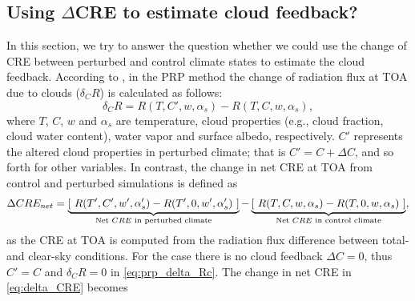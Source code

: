 \subsection{Using $\Delta$CRE to estimate cloud feedback?}
\label{sec:CRE_or_PRP}

In this section, we try to answer the question whether we could use the change of CRE between perturbed and control climate states to estimate the cloud feedback.
According to \cite{Soden2004}, in the PRP method the change of radiation flux at TOA due to clouds ($\delta_C {R}$) is calculated as follows:
\begin{equation}
    \delta_C R = {R}(T, C', w, \alpha_s) - {R}(T, C, w, \alpha_s),
    \label{eq:prp_delta_Rc}
\end{equation}
where $T$, $C$, $w$ and $\alpha_s$ are temperature, cloud properties (e.g., cloud fraction, cloud water content), water vapor and surface albedo, respectively. $C'$ represents the altered cloud properties in perturbed climate; that is $C'=C+\Delta C$, and so forth for other variables. 
In contrast, the change in net CRE at TOA from control and perturbed simulations is defined as
\begin{equation}
    \Delta CRE_{net} = \underbrace{\left[~{R}(T', C', w', \alpha'_s) - {R}(T', 0, w', \alpha'_s) ~\right]}_\text{\textcolor{black}{Net $CRE$ in perturbed climate}} - 
    \underbrace{\left[~{R}(T, C, w, \alpha_s)  - {R}(T, 0, w, \alpha_s) ~\right]}_\text{\textcolor{black}{Net $CRE$ in control climate}},
    \label{eq:delta_CRE}
\end{equation}
as the CRE at TOA is computed from the radiation flux difference between total- and clear-sky conditions. For the case there is no cloud feedback $\Delta C=0$, thus $C'=C$ and $\delta_C {R}=0$ in \eqref{eq:prp_delta_Rc}. The change in net CRE in \eqref{eq:delta_CRE} becomes
